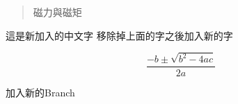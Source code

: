 \documentclass[12pt,A4paper]{article}
\begin{document}
\begin{abstract}
磁力與磁矩
\end{abstract}
 這是新加入的中文字
移除掉上面的字之後加入新的字

\[ 
   \frac{-b\pm\sqrt{b^2-4ac}}{2a} 
\]

加入新的Branch
\end{document}
